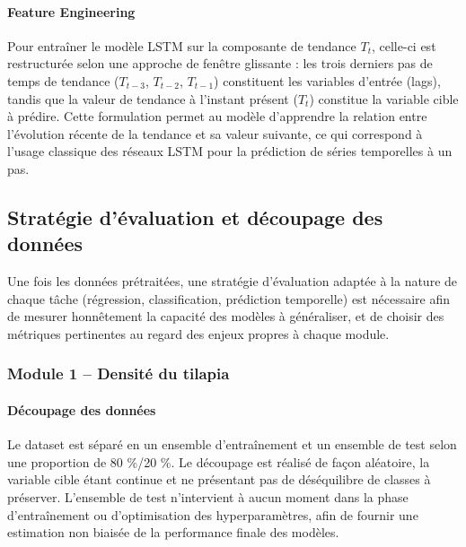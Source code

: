 \documentclass[a4paper,12pt, oneside]{article}
\begin{document}
\paragraph{Feature Engineering\\}
Pour entraîner le modèle LSTM sur la composante de tendance $T_t$, celle-ci est restructurée selon une approche de fenêtre glissante : les trois derniers pas de temps de tendance ($T_{t-3}$, $T_{t-2}$, $T_{t-1}$) constituent les variables d'entrée (lags), tandis que la valeur de tendance à l'instant présent ($T_t$) constitue la variable cible à prédire. Cette formulation permet au modèle d'apprendre la relation entre l'évolution récente de la tendance et sa valeur suivante, ce qui correspond à l'usage classique des réseaux LSTM pour la prédiction de séries temporelles à un pas.

\subsection{Stratégie d'évaluation et découpage des données}

Une fois les données prétraitées, une stratégie d'évaluation adaptée à la nature de chaque tâche (régression, classification, prédiction temporelle) est nécessaire afin de mesurer honnêtement la capacité des modèles à généraliser, et de choisir des métriques pertinentes au regard des enjeux propres à chaque module.

\subsubsection[Module 1]{Module 1 -- Densité du tilapia\\}
\paragraph{Découpage des données\\}
Le dataset est séparé en un ensemble d'entraînement et un ensemble de test selon une proportion de 80 \%/20 \%. Le découpage est réalisé de façon aléatoire, la variable cible étant continue et ne présentant pas de déséquilibre de classes à préserver. L'ensemble de test n'intervient à aucun moment dans la phase d'entraînement ou d'optimisation des hyperparamètres, afin de fournir une estimation non biaisée de la performance finale des modèles.
\end{document}
